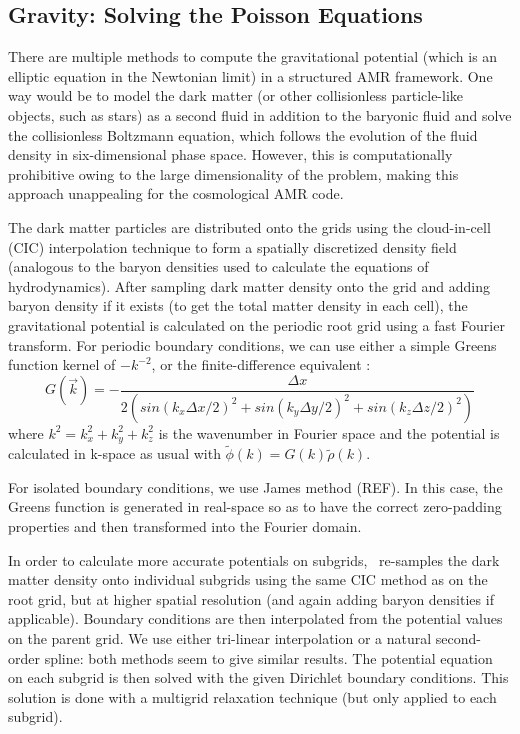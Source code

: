 \subsection{Gravity: Solving the Poisson Equations}
\label{sec.gravity}



There are multiple methods to compute the gravitational potential (which is an elliptic equation in the Newtonian limit) in a structured AMR framework.  One way would be to model the dark matter (or other collisionless particle-like objects, such as stars) as a second fluid in addition to the baryonic fluid and solve the collisionless Boltzmann equation, which follows the evolution of the fluid density in six-dimensional phase space.  However, this is computationally prohibitive owing to the large dimensionality of the problem, making this approach unappealing for the cosmological AMR code.

The dark matter particles are distributed onto the grids using the cloud-in-cell (CIC) interpolation technique to form a spatially discretized density field (analogous to the baryon densities used to calculate the equations of hydrodynamics).  After sampling dark matter density onto the grid and adding baryon density if it exists (to get the total matter density in each cell), the gravitational potential is calculated on the periodic root grid using a fast Fourier transform.  For periodic boundary conditions, we can use either a simple Greens function kernel of $-k^{-2}$, or the finite-difference equivalent \citep{HockneyEastwoord1980}:
\begin{equation}
G(\vec{k}) = - \frac{\Delta x}{2 \left( sin(k_x \Delta x/2)^2 + sin(k_y \Delta y/2)^2 + sin(k_z \Delta z/2)^2 \right) }
\end{equation}
where $k^2 = k_x^2 + k_y^2 + k_z^2$ is the wavenumber in Fourier space and the potential is calculated in k-space as usual with $\tilde{\phi}(k) = G(k) \tilde{\rho}(k)$.  

For isolated boundary conditions, we use James method (REF).  In this case, the Greens function is generated in real-space so as to have the correct zero-padding properties and then transformed into the Fourier domain.

In order to calculate more accurate potentials on subgrids, \enzo\ re-samples the dark matter density onto individual subgrids using the same CIC method as on the root grid, but at higher spatial resolution (and again adding baryon densities if applicable). Boundary conditions are then interpolated from the potential values on the parent grid.  We use either tri-linear interpolation or a natural second-order spline: both methods seem to give similar results. The potential equation on each subgrid is then solved with the given Dirichlet boundary conditions.  This solution is done with a multigrid relaxation technique (but only applied to each subgrid).


